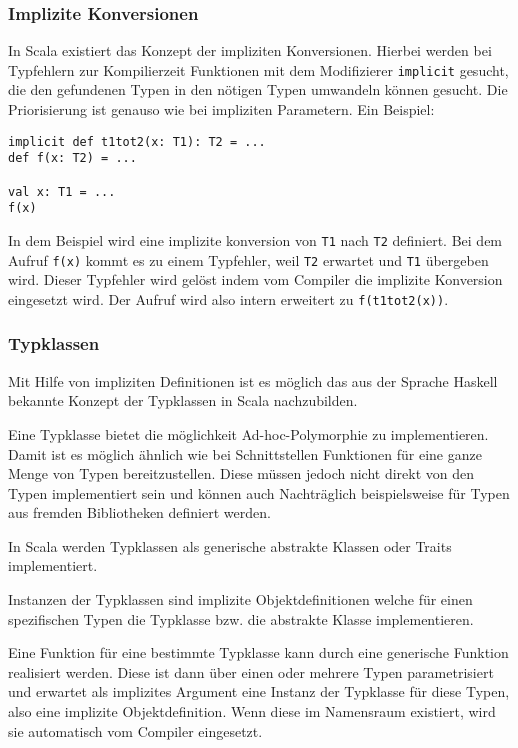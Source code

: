 \subsubsection{Implizite Konversionen}

In Scala existiert das Konzept der impliziten Konversionen. Hierbei werden bei  Typfehlern zur
Kompilierzeit Funktionen mit dem Modifizierer \texttt{implicit}  gesucht, die den gefundenen Typen
in den nötigen Typen umwandeln können gesucht.  Die Priorisierung ist genauso wie bei impliziten
Parametern. Ein Beispiel:

\begin{lstlisting}
implicit def t1tot2(x: T1): T2 = ...
def f(x: T2) = ...

val x: T1 = ...
f(x)
\end{lstlisting}

In dem Beispiel wird eine implizite konversion von \texttt{T1} nach \texttt{T2}  definiert. Bei dem
Aufruf \texttt{f(x)} kommt es zu einem Typfehler, weil  \texttt{T2} erwartet und \texttt{T1}
übergeben wird. Dieser Typfehler wird  gelöst indem vom Compiler die implizite Konversion eingesetzt
wird. Der Aufruf  wird also intern erweitert zu \texttt{f(t1tot2(x))}.

\subsubsection{Typklassen}

Mit Hilfe von impliziten Definitionen ist es möglich das aus der Sprache Haskell  bekannte Konzept
der Typklassen in Scala nachzubilden.

Eine Typklasse bietet die möglichkeit Ad-hoc-Polymorphie zu implementieren.  Damit ist es möglich
ähnlich wie bei Schnittstellen Funktionen für eine ganze  Menge von Typen bereitzustellen. Diese
müssen jedoch nicht direkt von den Typen  implementiert sein und können auch Nachträglich
beispielsweise für Typen aus  fremden Bibliotheken definiert werden.

In Scala werden Typklassen als generische abstrakte Klassen oder Traits  implementiert.

Instanzen der Typklassen sind implizite Objektdefinitionen welche für einen  spezifischen Typen die
Typklasse bzw. die abstrakte Klasse implementieren.

Eine Funktion für eine bestimmte Typklasse kann durch eine generische Funktion  realisiert werden.
Diese ist dann über einen oder mehrere Typen parametrisiert  und erwartet als implizites Argument
eine Instanz der Typklasse für diese Typen,  also eine implizite Objektdefinition. Wenn diese im
Namensraum existiert, wird  sie automatisch vom Compiler eingesetzt.


